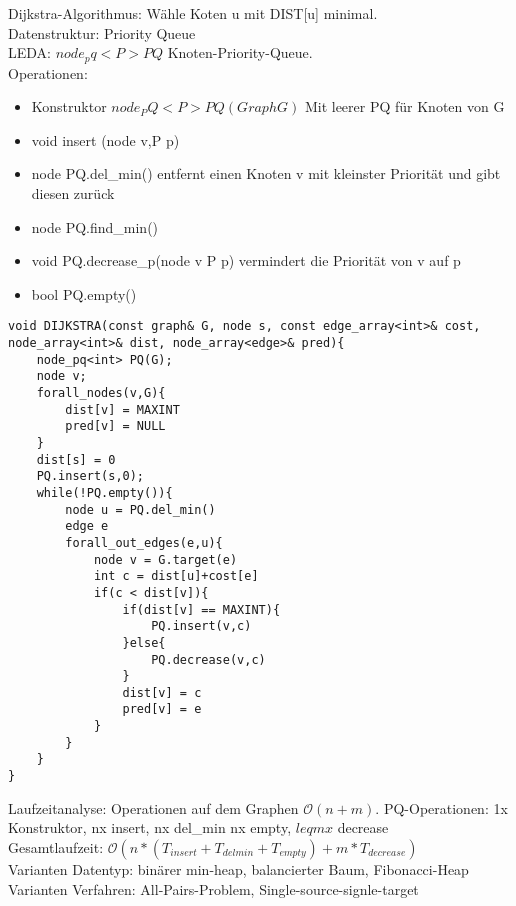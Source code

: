 \documentclass[a4paper]{article}
\newcommand{\oh}[1]{$\mathcal{O}(#1)$}
\begin{document}
Dijkstra-Algorithmus: Wähle Koten u mit DIST[u] minimal.\\
Datenstruktur: Priority Queue\\
LEDA: $node_pq<P> PQ$ Knoten-Priority-Queue.\\
Operationen: 
\begin{itemize}
\item Konstruktor $node_PQ<P> PQ(Graph G)$ Mit leerer PQ für Knoten von G\\
\item void insert (node v,P p)
\item node PQ.del\_min() entfernt einen Knoten v mit kleinster Priorität und gibt diesen zurück
\item node PQ.find\_min() 
\item void PQ.decrease\_p(node v P p) vermindert die Priorität von v auf p
\item bool PQ.empty()
\end{itemize}
\begin{lstlisting}
void DIJKSTRA(const graph& G, node s, const edge_array<int>& cost, node_array<int>& dist, node_array<edge>& pred){
	node_pq<int> PQ(G);
	node v;
	forall_nodes(v,G){
		dist[v] = MAXINT
		pred[v] = NULL
	}
	dist[s] = 0
	PQ.insert(s,0);
	while(!PQ.empty()){
		node u = PQ.del_min()
		edge e
		forall_out_edges(e,u){
			node v = G.target(e)
			int c = dist[u]+cost[e]
			if(c < dist[v]){
				if(dist[v] == MAXINT){
					PQ.insert(v,c)
				}else{
					PQ.decrease(v,c)
				}
				dist[v] = c
				pred[v] = e
			}
		}
	}
}
\end{lstlisting}
Laufzeitanalyse: Operationen auf dem Graphen \oh{n+m}. PQ-Operationen: 1x Konstruktor, nx insert, nx del\_min nx empty, $leq mx$ decrease\\
Gesamtlaufzeit: \oh{n*(T_{insert}+T_{delmin}+T_{empty})+m*T_{decrease}}\\
Varianten Datentyp: binärer min-heap, balancierter Baum, Fibonacci-Heap\\
Varianten Verfahren: All-Pairs-Problem, Single-source-signle-target\\
\end{document}
